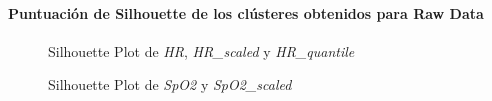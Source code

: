 \paragraph{Puntuación de Silhouette de los clústeres obtenidos para Raw Data}

\begin{figure}[H]
    \centering
    \caption{Silhouette Plot de \textit{HR}, \textit{HR\_scaled} y \textit{HR\_quantile}}\label{fig:raw_data_si_fc}
\end{figure}

\begin{figure}[ht]
    \centering
    \hfill
    \caption{Silhouette Plot de \textit{SpO2} y \textit{SpO2\_scaled}}\label{fig:raw_data_si_spo2}
\end{figure}

